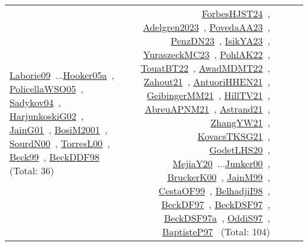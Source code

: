 {\begin{longtable}{p{3cm}r>{\raggedright\arraybackslash}p{6cm}>{\raggedright\arraybackslash}p{6cm}>{\raggedright\arraybackslash}p{8cm}}
\href{../works/Laborie09.pdf}{Laborie09}~\cite{Laborie09}...\href{../works/Hooker05a.pdf}{Hooker05a}~\cite{Hooker05a}, \href{../works/PolicellaWSO05.pdf}{PolicellaWSO05}~\cite{PolicellaWSO05}, \href{../works/Sadykov04.pdf}{Sadykov04}~\cite{Sadykov04}, \href{../works/HarjunkoskiG02.pdf}{HarjunkoskiG02}~\cite{HarjunkoskiG02}, \href{../works/JainG01.pdf}{JainG01}~\cite{JainG01}, \href{../works/BosiM2001.pdf}{BosiM2001}~\cite{BosiM2001}, \href{../works/SourdN00.pdf}{SourdN00}~\cite{SourdN00}, \href{../works/TorresL00.pdf}{TorresL00}~\cite{TorresL00}, \href{../works/Beck99.pdf}{Beck99}~\cite{Beck99}, \href{../works/BeckDDF98.pdf}{BeckDDF98}~\cite{BeckDDF98} (Total: 36) & \href{../works/ForbesHJST24.pdf}{ForbesHJST24}~\cite{ForbesHJST24}, \href{../works/Adelgren2023.pdf}{Adelgren2023}~\cite{Adelgren2023}, \href{../works/PovedaAA23.pdf}{PovedaAA23}~\cite{PovedaAA23}, \href{../works/PenzDN23.pdf}{PenzDN23}~\cite{PenzDN23}, \href{../works/IsikYA23.pdf}{IsikYA23}~\cite{IsikYA23}, \href{../works/YuraszeckMC23.pdf}{YuraszeckMC23}~\cite{YuraszeckMC23}, \href{../works/PohlAK22.pdf}{PohlAK22}~\cite{PohlAK22}, \href{../works/TouatBT22.pdf}{TouatBT22}~\cite{TouatBT22}, \href{../works/AwadMDMT22.pdf}{AwadMDMT22}~\cite{AwadMDMT22}, \href{../works/Zahout21.pdf}{Zahout21}~\cite{Zahout21}, \href{../works/AntuoriHHEN21.pdf}{AntuoriHHEN21}~\cite{AntuoriHHEN21}, \href{../works/GeibingerMM21.pdf}{GeibingerMM21}~\cite{GeibingerMM21}, \href{../works/HillTV21.pdf}{HillTV21}~\cite{HillTV21}, \href{../works/AbreuAPNM21.pdf}{AbreuAPNM21}~\cite{AbreuAPNM21}, \href{../works/Astrand21.pdf}{Astrand21}~\cite{Astrand21}, \href{../works/ZhangYW21.pdf}{ZhangYW21}~\cite{ZhangYW21}, \href{../works/KovacsTKSG21.pdf}{KovacsTKSG21}~\cite{KovacsTKSG21}, \href{../works/GodetLHS20.pdf}{GodetLHS20}~\cite{GodetLHS20}, \href{../works/MejiaY20.pdf}{MejiaY20}~\cite{MejiaY20}...\href{../works/Junker00.pdf}{Junker00}~\cite{Junker00}, \href{../works/BruckerK00.pdf}{BruckerK00}~\cite{BruckerK00}, \href{../works/JainM99.pdf}{JainM99}~\cite{JainM99}, \href{../works/CestaOF99.pdf}{CestaOF99}~\cite{CestaOF99}, \href{../works/BelhadjiI98.pdf}{BelhadjiI98}~\cite{BelhadjiI98}, \href{../works/BeckDF97.pdf}{BeckDF97}~\cite{BeckDF97}, \href{../works/BeckDSF97.pdf}{BeckDSF97}~\cite{BeckDSF97}, \href{../works/BeckDSF97a.pdf}{BeckDSF97a}~\cite{BeckDSF97a}, \href{../works/OddiS97.pdf}{OddiS97}~\cite{OddiS97}, \href{../works/BaptisteP97.pdf}{BaptisteP97}~\cite{BaptisteP97} (Total: 104)\\

\end{longtable}}
